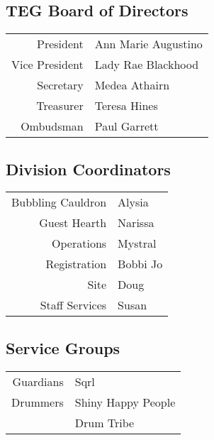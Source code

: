 \documentclass[9pt,twoside,openright,final,article,letterpaper]{memoir}
\let\oldsubsection=\subsection
\renewcommand{\subsection}[1]{%
  \vspace{6pt}
  \needspace{1.25in}
  \oldsubsection{#1}
  \nopagebreak}
\begin{document}
\begin{multicols}{2}

  \subsection{TEG Board of Directors}
  \begin{center}
    \begin{tabular}{rl}
      President & Ann Marie Augustino \\
      Vice President & Lady Rae Blackhood \\
      Secretary & Medea Athairn \\
      Treasurer & Teresa Hines \\
      Ombudsman & Paul Garrett \\
    \end{tabular}
  \end{center}

  \subsection{Division Coordinators}
  \begin{center}
    \begin{tabular}{rl}
      Bubbling Cauldron & Alysia \\
      Guest Hearth      & Narissa \\
      Operations        & Mystral \\
      Registration      & Bobbi Jo \hspace{1in} \\
      Site              & Doug \\
      Staff Services    & Susan \\
    \end{tabular}
  \end{center}

  \subsection{Service Groups}
  \begin{center}
    \begin{tabular}{rl}
      Guardians & Sqrl \\
      Drummers  & Shiny Happy People\\
      & Drum Tribe \\
    \end{tabular}
  \end{center}


\end{multicols}
\end{document}
